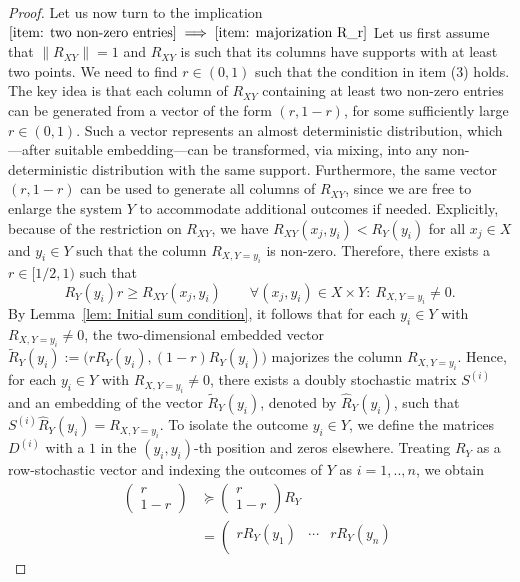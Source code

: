 \documentclass[aps,pra,11pt,onecolumn,nofootinbib,tightenlines]{revtex4-2}
\theoremstyle{definition}
\begin{document}
\begin{proof}
\bigskip
Let us now turn to the implication $\ref{item: two non-zero entries} \implies \ref{item: majorization R_r}$
Let us first assume that $\|R_{XY}\|=1$ and $R_{XY}$ is such that its columns have supports with at least two points. We need to find $r\in(0,1)$ such that the condition in item (3) holds. 
The key idea is that each column of \( R_{XY} \) containing at least two non-zero entries can be generated from a vector of the form \( (r, 1 - r) \), for some sufficiently large \( r \in (0,1) \). Such a vector represents an almost deterministic distribution, which—after suitable embedding—can be transformed, via mixing, into any non-deterministic distribution with the same support. Furthermore, the same vector \( (r, 1 - r) \) can be used to generate all columns of \( R_{XY} \), since we are free to enlarge the system \( Y \) to accommodate additional outcomes if needed. Explicitly, 
because of the restriction on $R_{XY}$, we have $R_{XY}(x_j,y_i)<R_Y(y_i)$ for all $x_j\in X$ and $y_i\in Y$ such that the column $R_{X,Y=y_i}$ is non-zero. Therefore, there exists a $r\in[1/2,1)$ such that
\begin{equation}
R_Y(y_i)r\geq R_{XY}(x_j,y_i)\qquad\forall(x_j,y_i)\in X\times Y:\ R_{X,Y=y_i}\neq0.
\end{equation}
By Lemma~\ref{lem: Initial sum condition}, it follows that for each \( y_i \in Y \) with \( R_{X,Y=y_i} \neq 0 \), the two-dimensional embedded vector $\widetilde{R}_Y(y_i) := \big(r R_Y(y_i), (1 - r) R_Y(y_i)\big)$
majorizes the column \( R_{X,Y=y_i} \).
Hence, for each \( y_i \in Y \) with \( R_{X,Y=y_i} \neq 0 \), there exists a doubly stochastic matrix \( S^{(i)} \) and an embedding of the vector \( \widetilde{R}_Y(y_i) \), denoted by \( \widehat{R}_Y(y_i) \), such that $S^{(i)} \widehat{R}_Y(y_i) = R_{X,Y=y_i}$.
To isolate the outcome \( y_i \in Y \), we define the matrices \( D^{(i)} \) with a $1$ in the \( (y_i, y_i) \)-th position and zeros elsewhere. Treating \( R_Y \) as a row-stochastic vector and indexing the outcomes of $Y$ as \( i = 1,..,n \), we obtain
\begin{align}
\left(\begin{array}{c}
r\\1-r
\end{array}\right)&\succeq\left(\begin{array}{c}
r\\1-r
\end{array}\right)R_Y\\
&=\left(\begin{array}{ccc}
rR_Y(y_1)&\cdots&rR_Y(y_n)\\

\end{array}
\end{align}
\end{proof}
\end{document}
